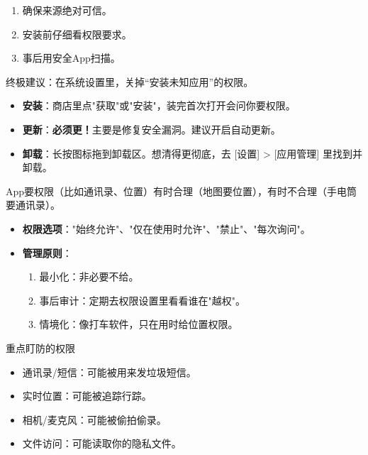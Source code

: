 \begin{enumerate}
  \item 确保来源绝对可信。
  \item 安装前仔细看权限要求。
  \item 事后用安全App扫描。
\end{enumerate}

终极建议：在系统设置里，关掉“安装未知应用”的权限。


\begin{itemize}
  \item \textbf{安装}：商店里点"获取"或"安装"，装完首次打开会问你要权限。
  \item \textbf{更新}：\textbf{必须更！}主要是修复安全漏洞。建议开启自动更新。
  \item \textbf{卸载}：长按图标拖到卸载区。想清得更彻底，去 [设置] > [应用管理] 里找到并卸载。
\end{itemize}


App要权限（比如通讯录、位置）有时合理（地图要位置），有时不合理（手电筒要通讯录）。

\begin{itemize}
  \item \textbf{权限选项}："始终允许"、"仅在使用时允许"、"禁止"、"每次询问"。
  \item \textbf{管理原则}：
  \begin{enumerate}
    \item 最小化：非必要不给。
    \item 事后审计：定期去权限设置里看看谁在"越权"。
    \item 情境化：像打车软件，只在用时给位置权限。
  \end{enumerate}
\end{itemize}

\begin{tcbwarn}{重点盯防的权限}
\begin{itemize}
  \item 通讯录/短信：可能被用来发垃圾短信。
  \item 实时位置：可能被追踪行踪。
  \item 相机/麦克风：可能被偷拍偷录。
  \item 文件访问：可能读取你的隐私文件。
\end{itemize}

\end{tcbwarn}

